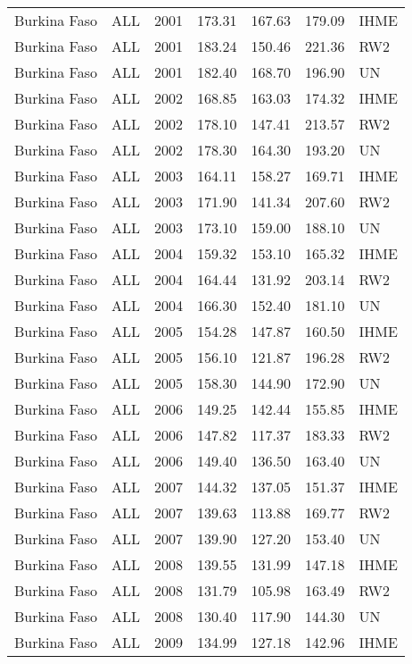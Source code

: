 \begin{longtable}{lllrrrl}
  Burkina Faso & ALL & 2001 & 173.31 & 167.63 & 179.09 & IHME \\ 
  Burkina Faso & ALL & 2001 & 183.24 & 150.46 & 221.36 & RW2 \\ 
  Burkina Faso & ALL & 2001 & 182.40 & 168.70 & 196.90 & UN \\ 
  Burkina Faso & ALL & 2002 & 168.85 & 163.03 & 174.32 & IHME \\ 
  Burkina Faso & ALL & 2002 & 178.10 & 147.41 & 213.57 & RW2 \\ 
  Burkina Faso & ALL & 2002 & 178.30 & 164.30 & 193.20 & UN \\ 
  Burkina Faso & ALL & 2003 & 164.11 & 158.27 & 169.71 & IHME \\ 
  Burkina Faso & ALL & 2003 & 171.90 & 141.34 & 207.60 & RW2 \\ 
  Burkina Faso & ALL & 2003 & 173.10 & 159.00 & 188.10 & UN \\ 
  Burkina Faso & ALL & 2004 & 159.32 & 153.10 & 165.32 & IHME \\ 
  Burkina Faso & ALL & 2004 & 164.44 & 131.92 & 203.14 & RW2 \\ 
  Burkina Faso & ALL & 2004 & 166.30 & 152.40 & 181.10 & UN \\ 
  Burkina Faso & ALL & 2005 & 154.28 & 147.87 & 160.50 & IHME \\ 
  Burkina Faso & ALL & 2005 & 156.10 & 121.87 & 196.28 & RW2 \\ 
  Burkina Faso & ALL & 2005 & 158.30 & 144.90 & 172.90 & UN \\ 
  Burkina Faso & ALL & 2006 & 149.25 & 142.44 & 155.85 & IHME \\ 
  Burkina Faso & ALL & 2006 & 147.82 & 117.37 & 183.33 & RW2 \\ 
  Burkina Faso & ALL & 2006 & 149.40 & 136.50 & 163.40 & UN \\ 
  Burkina Faso & ALL & 2007 & 144.32 & 137.05 & 151.37 & IHME \\ 
  Burkina Faso & ALL & 2007 & 139.63 & 113.88 & 169.77 & RW2 \\ 
  Burkina Faso & ALL & 2007 & 139.90 & 127.20 & 153.40 & UN \\ 
  Burkina Faso & ALL & 2008 & 139.55 & 131.99 & 147.18 & IHME \\ 
  Burkina Faso & ALL & 2008 & 131.79 & 105.98 & 163.49 & RW2 \\ 
  Burkina Faso & ALL & 2008 & 130.40 & 117.90 & 144.30 & UN \\ 
  Burkina Faso & ALL & 2009 & 134.99 & 127.18 & 142.96 & IHME \\ 

\end{longtable}
